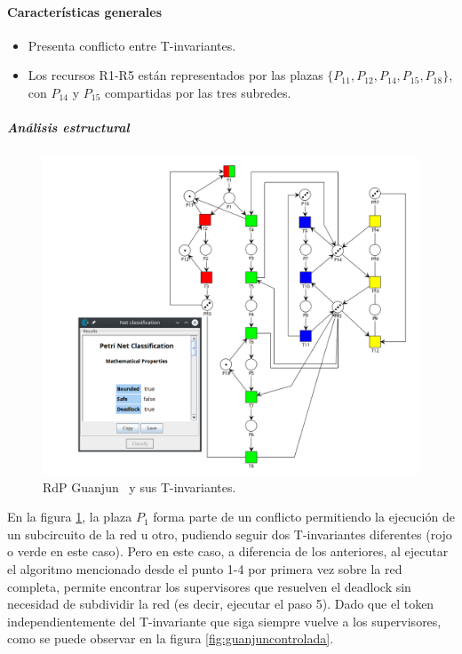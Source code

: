 \paragraph{Características generales}
\begin{itemize}
    \item Presenta conflicto entre T-invariantes.
    \item Los recursos R1-R5 están representados por las plazas $\{P_{11}, P_{12}, P_{14}, P_{15}, P_{18}\}$, con $P_{14}$ y $P_{15}$ compartidas por las tres subredes.
\end{itemize}

\subparagraph{Análisis estructural}
\hfill
\begin{figure}[H]
	\centering
	\includegraphics[scale=0.5]{Figures/algoritmo3/Guanjun1.png}
	\caption[RdP Guanjun \ y sus T-invariantes.]{RdP Guanjun \footnotemark \ y sus T-invariantes.}
	\label{fig:guanjuntinvariantes}
 \end{figure} 
 
En la figura \ref{fig:guanjuntinvariantes}, la plaza $P_1$ forma parte de un conflicto permitiendo la ejecución de un subcircuito de la red u otro, pudiendo seguir dos T-invariantes diferentes (rojo o verde en este caso). Pero en este caso, a diferencia de los anteriores, al ejecutar el algoritmo mencionado desde el punto 1-4 por primera vez sobre la red completa, permite encontrar los supervisores que resuelven el deadlock sin necesidad de subdividir la red (es decir, ejecutar el paso 5). Dado que el token independientemente del T-invariante que siga siempre vuelve a los supervisores, como se puede observar en la figura \ref{fig:guanjuncontrolada}.\\

